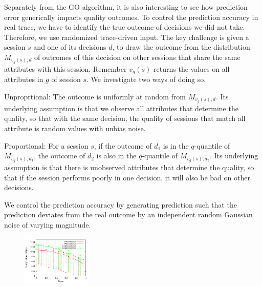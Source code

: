 
Separately from the GO algorithm, it is also interesting to see how prediction error generically impacts quality outcomes.  To control the prediction accuracy in real trace, we have to identify the true outcome of decisions we did not take. Therefore, we use randomized trace-driven input. The key challenge is given a session $s$ and one of its decisions $d$, to draw the outcome from the distribution $M_{v_g(s),d}$ of outcomes of this decision on other sessions that share the same attributes with this session. Remember $v_g(s)$ returns the values on all attributes in $g$ of session $s$. We investigate two ways of doing so. 
\begin{packedenumerate}
	\item Unproprtional: The outcome is uniformly at random from $M_{v_g(s),d}$. Its underlying assumption is that we observe all attributes that determine the quality, so that with the same decision, the quality of sessions that match all attribute is random values with unbias noise.
	\item Proportional: For a session $s$, if the outcome of $d_1$ is in the $q$-quantile of $M_{v_g(s),d_1}$, the outcome of $d_2$ is also in the $q$-quantile of $M_{v_g(s),d_2}$. Its underlying assumption is that there is unobserved attributes that determine the quality, so that if the session performs poorly in one decision, it will also be bad on other decisions.
\end{packedenumerate}

We control the prediction accuracy by generating prediction such that the prediction deviates from the real outcome by an independent random Gaussian noise of varying magnitude. 

\begin{figure}[h!]
\centering
 \includegraphics[width=0.3\textwidth] {figures/impact/result-noise-impact.pdf}
\label{fig:cdn-degradation}
\end{figure}

